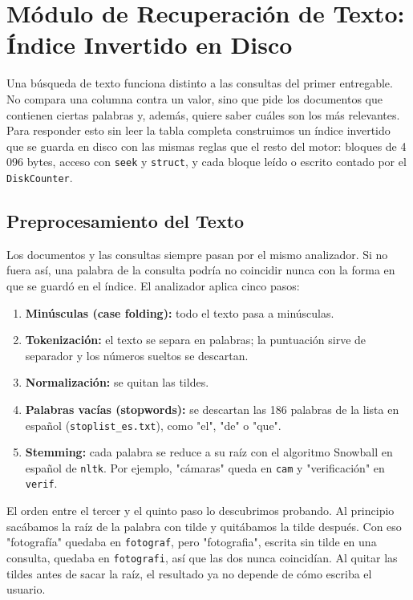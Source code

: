 \documentclass[a4paper,12pt]{article}
\begin{document}

\section{Módulo de Recuperación de Texto: Índice Invertido en Disco}

Una búsqueda de texto funciona distinto a las consultas del primer entregable.
No compara una columna contra un valor, sino que pide los documentos que
contienen ciertas palabras y, además, quiere saber cuáles son los más
relevantes. Para responder esto sin leer la tabla completa construimos un índice
invertido que se guarda en disco con las mismas reglas que el resto del motor:
bloques de 4\,096 bytes, acceso con \texttt{seek} y \texttt{struct}, y cada
bloque leído o escrito contado por el \texttt{DiskCounter}.

\subsection{Preprocesamiento del Texto}

Los documentos y las consultas siempre pasan por el mismo analizador. Si no
fuera así, una palabra de la consulta podría no coincidir nunca con la forma en
que se guardó en el índice. El analizador aplica cinco pasos:

\begin{enumerate}
    \item \textbf{Minúsculas (case folding):} todo el texto pasa a minúsculas.
    \item \textbf{Tokenización:} el texto se separa en palabras; la puntuación
    sirve de separador y los números sueltos se descartan.
    \item \textbf{Normalización:} se quitan las tildes.
    \item \textbf{Palabras vacías (stopwords):} se descartan las 186 palabras de
    la lista en español (\texttt{stoplist\_es.txt}), como "el", "de" o "que".
    \item \textbf{Stemming:} cada palabra se reduce a su raíz con el algoritmo
    Snowball en español de \texttt{nltk}. Por ejemplo, "cámaras" queda en
    \texttt{cam} y "verificación" en \texttt{verif}.
\end{enumerate}

El orden entre el tercer y el quinto paso lo descubrimos probando. Al principio
sacábamos la raíz de la palabra con tilde y quitábamos la tilde después. Con eso
"fotografía" quedaba en \texttt{fotograf}, pero "fotografia", escrita sin tilde
en una consulta, quedaba en \texttt{fotografi}, así que las dos nunca
coincidían. Al quitar las tildes antes de sacar la raíz, el resultado ya no
depende de cómo escriba el usuario.
\end{document}

